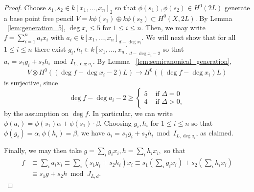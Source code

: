 \documentclass{amsart}
\theoremstyle{plain}
\theoremstyle{definition}
\theoremstyle{remark}
\numberwithin{equation}{section}
\begin{document}
\begin{proof}
Choose $s_1,s_2 \in k[x_1, \ldots, x_n]_2$ so that $\phi(s_1),\phi(s_2) \in H^0(2L)$ generate a base point free pencil $V = k \phi(s_1) \oplus k \phi(s_2)\subset H^0(X,2L)$.
By Lemma ~\ref{lem:generation_5}, $\deg x_i \leq 5$ for $1 \leq i \leq n$. Then, we may write $f = \sum_{i = 1}^{n}a_i x_i$ with $a_i \in k[x_1, \ldots, x_n]_{d-\deg x_i}$.
We will next show that for all $1 \leq i \leq n$ there exist $g_i, h_i \in k[x_1, \ldots, x_n]_{d - \deg x_i - 2}$ so that $a_i = s_1g_i + s_2h_i \bmod I_{L,\deg a_i}.$ 
By Lemma ~\ref{lem:semicanonical_generation},
\begin{align*}
	V \otimes H^0((\deg f-\deg x_i -2)L) \rightarrow H^0((\deg f-\deg x_i)L)
\end{align*}
is surjective, since
$$
\deg f- \deg a_i -2 \geq \begin{cases}
	5 &\text{ if }\Delta = 0\\
	4 &\text{ if }\Delta > 0,
\end{cases}$$
by the assumption on $\deg f$.
In particular, we can write $\phi(a_i) = \phi(s_1) \alpha + \phi(s_1) \cdot \beta$. Choosing $g_i,h_i$ for $1 \leq i \leq n$ so that $\phi(g_i) = \alpha,\phi(h_i) = \beta$, we have $a_i = s_1 g_i + s_2 h_i \bmod I_{L,\deg a_i}$, as claimed.

Finally, we may then take $g = \sum_{i}^{}g_i x_i,h = \sum_{i}^{}h_i x_i,$ so that 
\begin{align*}
	f &\equiv \sum_{i}^{}a_i x_i \equiv \sum_{i}^{}(s_1g_i + s_2h_i)x_i \equiv s_1 \left( \sum_{i}^{}g_i x_i \right) + s_2 \left( \sum_{i}^{}h_i x_i \right) \\
	&\equiv s_1 g + s_2 h \bmod J_{L,d}.
\end{align*}
\end{proof}
\end{document}

